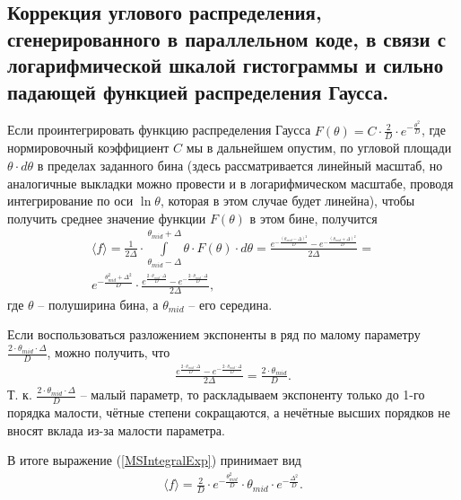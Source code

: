 \documentclass[a4paper,12pt]{article}
\begin{document}
\begin{large}
\subsection{Коррекция углового распределения, сгенерированного в параллельном коде, в связи с логарифмической шкалой гистограммы и сильно падающей функцией распределения Гаусса.}
\label{subValMS4}

	Если проинтегрировать функцию распределения Гаусса $F(\theta)=C \cdot \frac{2}{D} \cdot e^{-\frac{\theta^2}{D}}$, где нормировочный коэффициент $C$ мы в дальнейшем опустим, по угловой площади $\theta \cdot d\theta$ в пределах заданного бина (здесь рассматривается линейный масштаб, но аналогичные выкладки можно провести и в логарифмическом масштабе, проводя интегрирование по оси $\ln{\theta}$, которая в этом случае будет линейна), чтобы получить среднее значение функции $F(\theta)$ в этом бине, получится
\begin{equation}
\label{MSIntegralExp}
\begin{aligned} 
  \langle f \rangle = \frac{1}{2\Delta} \cdot \int \limits_{\theta_{mid} - \Delta}^{\theta_{mid} + \Delta} \theta \cdot F(\theta) \cdot d \theta =
  \frac{e^{-\frac{\left( \theta_{mid} - \Delta \right)^2}{D}} - e^{-\frac{\left( \theta_{mid} + \Delta \right)^2}{D}}}{2\Delta} = \\
  e^{-\frac{\theta^2_{mid} + \Delta^2}{D}} \cdot \frac{ e^{\frac{2 \cdot \theta_{mid} \cdot \Delta}{D}} - e^{-\frac{2 \cdot \theta_{mid} \cdot \Delta}{D}} }{2\Delta},
\end{aligned}
\end{equation}
	где $\theta$ -- полуширина бина, а $\theta_{mid}$ -- его середина.

	Если воспользоваться разложением экспоненты в ряд по малому параметру $\frac{2 \cdot \theta_{mid} \cdot \Delta}{D}$, можно получить, что
\begin{equation}
\label{MSIntegralExpand}
\begin{aligned} 
  \frac{ e^{\frac{2 \cdot \theta_{mid} \cdot \Delta}{D}} - e^{-\frac{2 \cdot \theta_{mid} \cdot \Delta}{D}} }{2\Delta} =
  \frac{2 \cdot \theta_{mid}}{D}.
\end{aligned}
\end{equation}
	Т. к. $\frac{2 \cdot \theta_{mid} \cdot \Delta}{D}$ -- малый параметр, то раскладываем экспоненту только до 1-го порядка малости, чётные степени сокращаются, а нечётные высших порядков не вносят вклада из-за малости параметра.

	В итоге выражение (\ref{MSIntegralExp}) принимает вид
\begin{equation}
\label{MSIntegralFin}
\begin{aligned} 
  \langle f \rangle = \frac{2}{D} \cdot e^{-\frac{\theta^2_{mid}}{D}} \cdot \theta_{mid} \cdot e^{-\frac{\Delta^2}{D}} .
\end{aligned}
\end{equation}


\end{large}
\end{document}
